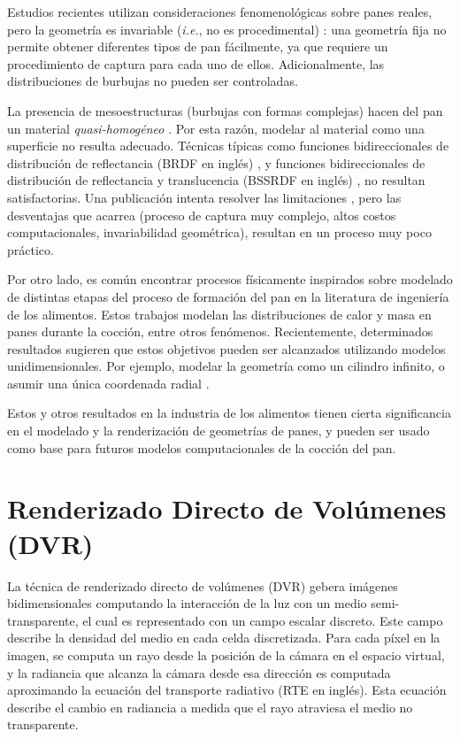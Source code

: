 Estudios recientes utilizan consideraciones fenomenológicas sobre panes reales, pero la geometría es invariable ({\em i.e.}, no es procedimental) \cite{VanDyck2014}: una geometría fija no permite obtener diferentes tipos de pan fácilmente, ya que requiere un procedimiento de captura para cada uno de ellos.
Adicionalmente, las distribuciones de burbujas no pueden ser controladas.

La presencia de mesoestructuras (burbujas con formas complejas) hacen del pan un material {\em quasi-homogéneo} \cite{Tong2005}. 
Por esta razón, modelar al material como una superficie no resulta adecuado.
Técnicas típicas como funciones bidireccionales de distribución de reflectancia (BRDF en inglés) \cite{Kurt2009}, y funciones bidireccionales de distribución de reflectancia y translucencia (BSSRDF en inglés) \cite{Donner2009}, no resultan satisfactorias.
Una publicación intenta resolver las limitaciones \cite{Tong2005}, pero las desventajas que acarrea (proceso de captura muy complejo, altos costos computacionales, invariabilidad geométrica), resultan en un proceso muy poco práctico.

Por otro lado, es común encontrar procesos físicamente inspirados sobre modelado de distintas etapas del proceso de formación del pan en la literatura de ingeniería de los alimentos.
Estos trabajos modelan las distribuciones de calor y masa en panes durante la cocción, entre otros fenómenos.
Recientemente, determinados resultados sugieren que estos objetivos pueden ser alcanzados utilizando modelos unidimensionales.
Por ejemplo, modelar la geometría como un cilindro infinito, o asumir una única coordenada radial \cite{Purlis2012, Thorvaldsson1999}.

Estos y otros resultados en la industria de los alimentos tienen cierta significancia en el modelado y la renderización de geometrías de panes, y pueden ser usado como base para futuros modelos computacionales de la cocción del pan.


\section{Renderizado Directo de Volúmenes (DVR)}

La técnica de renderizado directo de volúmenes (DVR) \cite{Kratz2006} gebera imágenes bidimensionales computando la interacción de la luz con un medio semi-transparente, el cual es representado con un campo escalar discreto.
Este campo describe la densidad del medio en cada celda discretizada.
Para cada píxel en la imagen, se computa un rayo desde la posición de la cámara en el espacio virtual, y la radiancia que alcanza la cámara desde esa dirección es computada aproximando la ecuación del transporte radiativo (RTE en inglés).
Esta ecuación describe el cambio en radiancia a medida que el rayo atraviesa el medio no transparente.

